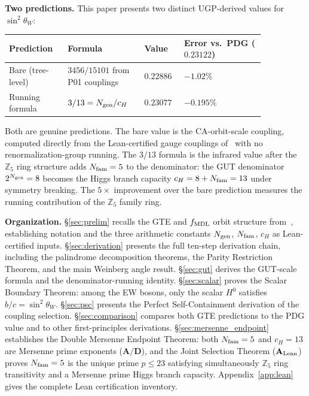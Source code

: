 \documentclass[11pt]{article}
\theoremstyle{remark}
\newcommand{\Ngen}{N_{\rm gen}}
\newcommand{\Nfam}{N_{\rm fam}}
\newcommand{\cH}{c_H}
\newcommand{\sinwsq}{\sin^2\!\theta_W}
\newcommand{\CatAL}{\ensuremath{\textbf{A}_{\rm Lean}}}
\newcommand{\CatAD}{\textbf{A/D}}
\begin{document}
\medskip

\textbf{Two predictions.}
This paper presents two distinct UGP-derived values for $\sinwsq$:
\begin{center}
\small
\renewcommand{\arraystretch}{1.3}
\begin{tabular}{@{}P{0.20\linewidth}P{0.25\linewidth}P{0.12\linewidth}P{0.28\linewidth}@{}}
\toprule
Prediction & Formula & Value & Error vs.\ PDG ($0.23122$)\\
\midrule
Bare (tree-level) & $3456/15101$ from P01 couplings & $0.22886$ & $-1.02\%$\\
Running formula   & $3/13 = \Ngen/\cH$              & $0.23077$ & $-0.195\%$\\
\bottomrule
\end{tabular}
\end{center}
Both are genuine predictions.
The bare value is the CA-orbit-scale coupling, computed directly from the Lean-certified
gauge couplings of~\cite{Spivack2026_SM_UGP} with no renormalization-group running.
The $3/13$ formula is the infrared value after the $\mathbb{Z}_5$ ring structure adds
$\Nfam = 5$ to the denominator: the GUT denominator $2^{\Ngen} = 8$ becomes the Higgs
branch capacity $\cH = 8 + \Nfam = 13$ under symmetry breaking.
The $5\times$ improvement over the bare prediction measures the running contribution
of the $\mathbb{Z}_5$ family ring.

\medskip

\textbf{Organization.}
\S\ref{sec:prelim} recalls the GTE and $f_{\rm MDL}$ orbit structure from~\cite{SpivackCompUniversality,Spivack2026_SM_UGP}, establishing notation and the three arithmetic constants $\Ngen$, $\Nfam$, $\cH$ as Lean-certified inputs.
\S\ref{sec:derivation} presents the full ten-step derivation chain, including the palindrome decomposition theorems, the Parity Restriction Theorem, and the main Weinberg angle result.
\S\ref{sec:gut} derives the GUT-scale formula and the denominator-running identity.
\S\ref{sec:scalar} proves the Scalar Boundary Theorem: among the EW bosons, only the scalar $H^0$ satisfies $b/c = \sinwsq$.
\S\ref{sec:psc} presents the Perfect Self-Containment derivation of the coupling selection.
\S\ref{sec:comparison} compares both GTE predictions to the PDG value and to other
first-principles derivations.
\S\ref{sec:mersenne_endpoint} establishes the Double Mersenne Endpoint Theorem: both
$\Nfam = 5$ and $\cH = 13$ are Mersenne prime exponents ($\CatAD$), and the Joint
Selection Theorem ($\CatAL$) proves $\Nfam = 5$ is the unique prime $p \leq 23$
satisfying simultaneously $\mathbb{Z}_5$ ring transitivity and a Mersenne prime Higgs
branch capacity.
Appendix~\ref{app:lean} gives the complete Lean certification inventory.
\end{document}
